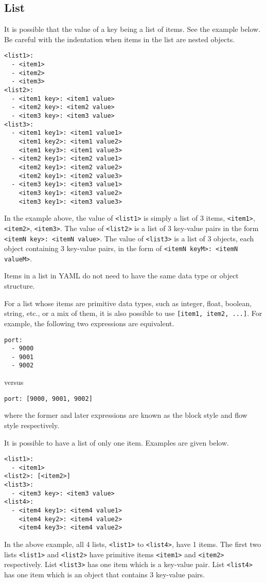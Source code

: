 \subsection{List}

It is possible that the value of a key being a list of items. See the example below. Be careful with the indentation when items in the list are nested objects.
\begin{lstlisting}
<list1>:
  - <item1>
  - <item2>
  - <item3>
<list2>:
  - <item1 key>: <item1 value>
  - <item2 key>: <item2 value>
  - <item3 key>: <item3 value>
<list3>:
  - <item1 key1>: <item1 value1>
    <item1 key2>: <item1 value2>
    <item1 key3>: <item1 value3>
  - <item2 key1>: <item2 value1>
    <item2 key1>: <item2 value2>
    <item2 key1>: <item2 value3>
  - <item3 key1>: <item3 value1>
    <item3 key1>: <item3 value2>
    <item3 key1>: <item3 value3>
\end{lstlisting}
In the example above, the value of \verb|<list1>| is simply a list of 3 items, \verb|<item1>|, \verb|<item2>|, \verb|<item3>|. The value of \verb|<list2>| is a list of 3 key-value pairs in the form \verb|<itemN key>: <itemN value>|. The value of \verb|<list3>| is a list of 3 objects, each object containing 3 key-value pairs, in the form of \verb|<itemN keyM>: <itemN valueM>|.

Items in a list in YAML do not need to have the same data type or object structure.

For a list whose items are primitive data types, such as integer, float, boolean, string, etc., or a mix of them, it is also possible to use \verb|[item1, item2, ...]|. For example, the following two expressions are equivalent.
\begin{lstlisting}
port:
  - 9000
  - 9001
  - 9002
\end{lstlisting}
versus
\begin{lstlisting}
port: [9000, 9001, 9002]
\end{lstlisting}
where the former and later expressions are known as the block style and flow style respectively.

It is possible to have a list of only one item. Examples are given below.
\begin{lstlisting}
<list1>:
  - <item1>
<list2>: [<item2>]
<list3>:
  - <item3 key>: <item3 value>
<list4>:
  - <item4 key1>: <item4 value1>
    <item4 key2>: <item4 value2>
    <item4 key3>: <item4 value2>
\end{lstlisting}
In the above example, all 4 lists, \verb|<list1>| to \verb|<list4>|, have 1 items. The first two lists \verb|<list1>| and \verb|<list2>| have primitive items \verb|<item1>| and \verb|<item2>| respectively. List \verb|<list3>| has one item which is a key-value pair. List \verb|<list4>| has one item which is an object that contains 3 key-value pairs.


